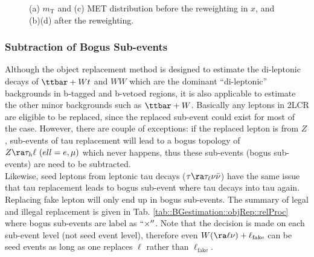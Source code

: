 \begin{description}
\begin{figure}[h]
  \centering
    \caption{ (a) $m_{\mathrm{T}}$ and (c) MET distribution before the reweighting in $x$, and (b)(d) after the reweighting.  \label{fig::BGestimation::objRep::mcClosure::rwgt_x_mt} }
\end{figure}



\end{description}


\clearpage



\clearpage
\subsubsection{Subtraction of Bogus Sub-events} \label{sec::BGestimation::objRep::subtraction}
Although the object replacement method is designed to estimate the di-leptonic decays of $\ttbar+Wt$ and $WW$ which are the dominant ``di-leptonic'' backgrounds in b-tagged and b-vetoed regions, it is also applicable to estimate the other minor backgrounds such as $\ttbar+W$. 
Basically any leptons in 2LCR are eligible to be replaced, since the replaced sub-event could exist for most of the case.
However, there are couple of exceptions: if the replaced lepton is from $Z$, sub-events of tau replacement will lead to a bogus topology of $Z\ra \tau_h \ell \,\, (ell=e,\mu)$ which never happens, thus these sub-events (bogus sub-events) are need to be subtracted.  \\

Likewise, seed leptons from leptonic tau decays ($\tau \ra \tau_{\ell} \nu\bar{\nu}$) have the same issue 
that tau replacement leads to bogus sub-event where tau decays into tau again. Replacing fake lepton will only end up in bogus sub-events. 
The summary of legal and illegal replacement is given in Tab. \ref{tab::BGestimation::objRep::relProc} where bogus sub-events are label as $``\times''$.
Note that the decision is made on each sub-event level (not seed event level), therefore even $W(\ra \ell \nu)+\ell_{\mathrm{fake}}$ can be seed events as long as one replaces $\ell$ rather than $\ell_{\mathrm{fake}}$. \\

